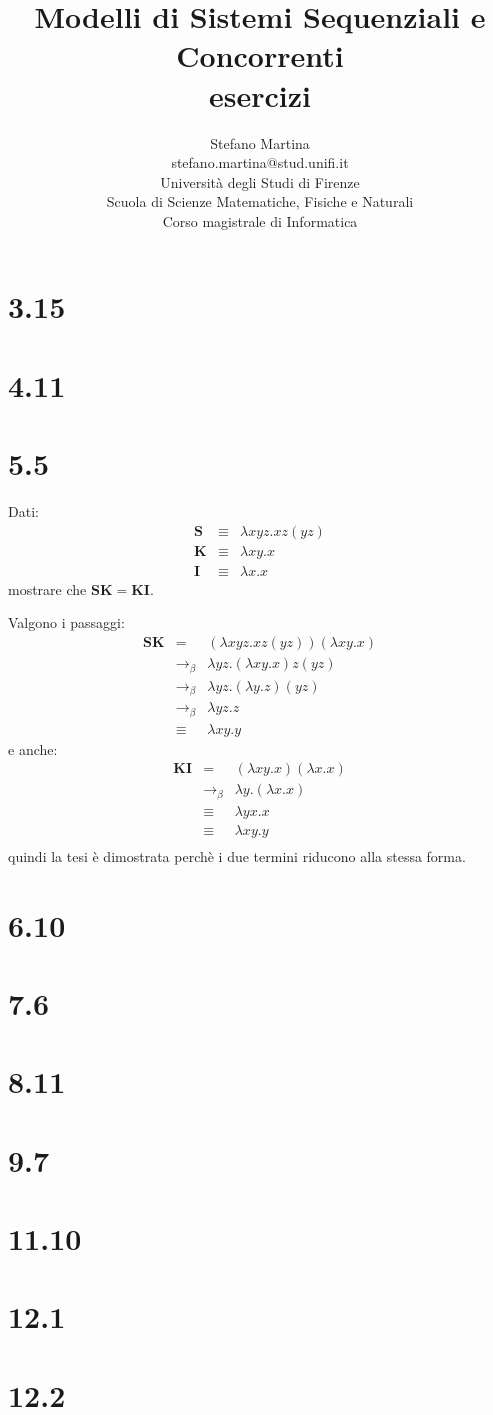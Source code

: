 \documentclass[a4paper,twosides]{report}
\author{
  {\Large Stefano Martina}\\
  {\small stefano.martina@stud.unifi.it}\\
  Universit\`a degli Studi di Firenze\\
  Scuola di Scienze Matematiche, Fisiche e Naturali\\
  Corso magistrale di Informatica
}
\title{{\Huge\bfseries Modelli di Sistemi Sequenziali e
    Concorrenti}\\{\large\bfseries esercizi}}
\newcommand{\betaReduction}{\ensuremath{\longrightarrow_{\beta}}}
\begin{document}
\maketitle

\section*{3.15}

\section*{4.11}

\section*{5.5}
Dati:
\begin{eqnarray*}
  \mathbf{S}&\equiv&\lambda xyz.xz(yz)\\
  \mathbf{K}&\equiv&\lambda xy.x\\
  \mathbf{I}&\equiv&\lambda x.x
\end{eqnarray*}
mostrare che $\mathbf{SK}=\mathbf{KI}$.

Valgono i passaggi:
\begin{eqnarray*}
  \mathbf{SK}&=&(\lambda xyz.xz(yz))(\lambda xy.x)\\
  &\betaReduction&\lambda yz.(\lambda xy.x)z(yz)\\
  &\betaReduction&\lambda yz.(\lambda y.z)(yz)\\
  &\betaReduction&\lambda yz.z\\
  &\equiv&\lambda xy.y
\end{eqnarray*}
e anche:
\begin{eqnarray*}
  \mathbf{KI}&=&(\lambda xy.x)(\lambda x.x)\\
  &\betaReduction&\lambda y.(\lambda x.x)\\
  &\equiv&\lambda yx.x\\
  &\equiv&\lambda xy.y\\
\end{eqnarray*}
quindi la tesi \`e dimostrata perch\`e i due termini riducono alla
stessa forma. 
\section*{6.10}

\section*{7.6}

\section*{8.11}

\section*{9.7}

\section*{11.10}

\section*{12.1}

\section*{12.2}
 
\end{document}
